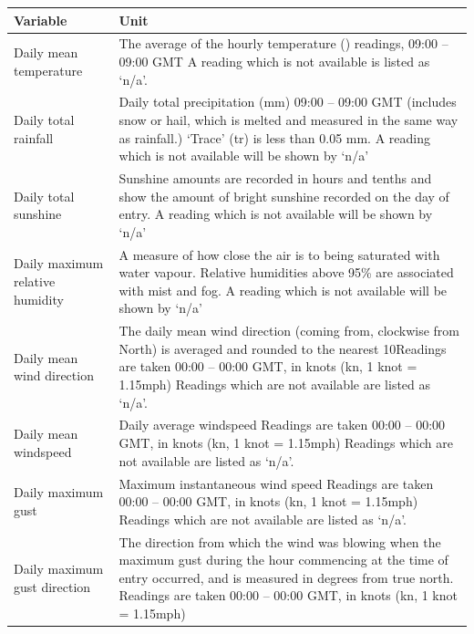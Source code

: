 \documentclass[A4paper, 11pt]{article}
\begin{document}
	\begin{tabular}{|p{5.5cm}|p{11.5cm}|}
		\hline
		\textbf{Variable} & \textbf{Unit} \\
		\hline
		Daily mean temperature & The average of the hourly temperature (\textcelsius) readings, 09:00 – 09:00 GMT \newline A reading which is not available is listed as ‘n/a’.
		 \\
		\hline
		Daily total rainfall & Daily total precipitation (mm) 09:00 – 09:00 GMT
		(includes snow or hail, which is melted and measured in the same way as rainfall.)
		‘Trace’ (tr) is less than 0.05 mm. \newline A reading which is not available will be shown by ‘n/a’
		 \\
		\hline
		Daily total sunshine & Sunshine amounts are recorded in hours and tenths and show the amount of bright sunshine recorded on the day of entry. \newline A reading which is not available will be shown by ‘n/a’ \\
		\hline
		Daily maximum relative humidity & A measure of how close the air is to being saturated with water vapour. \newline Relative humidities above 95\% are associated with mist and fog. \newline A reading which is not available will be shown by ‘n/a’
		 \\
		\hline
		Daily mean wind direction & The daily mean wind direction (coming from, clockwise from North) is averaged and rounded to the nearest 10\textdegree \newline Readings are taken 00:00 – 00:00 GMT, in knots (kn, 1 knot = 1.15mph) \newline
		Readings which are not available are listed as ‘n/a’.
		  \\
		\hline
		Daily mean windspeed & Daily average windspeed \newline Readings are taken 00:00 – 00:00 GMT, in knots (kn, 1 knot = 1.15mph) \newline
		Readings which are not available are listed as ‘n/a’. \\
		\hline
		Daily maximum gust & Maximum instantaneous wind speed \newline Readings are taken 00:00 – 00:00 GMT, in knots (kn, 1 knot = 1.15mph) \newline
		Readings which are not available are listed as ‘n/a’.  \\
		\hline
		Daily maximum gust direction & The direction from which the wind was blowing when the maximum gust during the hour commencing at the time of entry occurred, and is measured in degrees from true north. \newline Readings are taken 00:00 – 00:00 GMT, in knots (kn, 1 knot = 1.15mph) \newline

\end{tabular}
\end{document}
